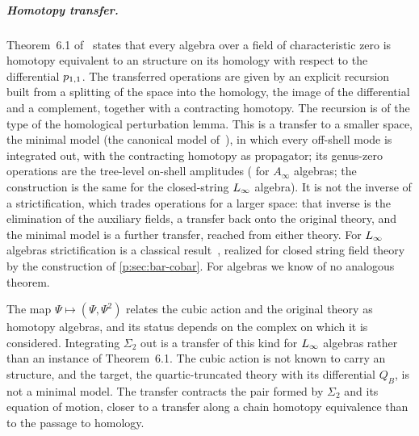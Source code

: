 \subparagraph{Homotopy transfer.}

Theorem~6.1 of~\cite{Cieliebak:2015:HomologicalAlgebraRelated} states that every \IBL{} algebra over a field of characteristic zero is homotopy equivalent to an \IBL{} structure on its homology with respect to the differential $p_{1,1}$.
The transferred operations are given by an explicit recursion built from a splitting of the space into the homology, the image of the differential and a complement, together with a contracting homotopy.
The recursion is of the type of the homological perturbation lemma.
This is a transfer to a smaller space, the minimal model (the canonical model of~\cite{Cieliebak:2015:HomologicalAlgebraRelated}), in which every off-shell mode is integrated out, with the contracting homotopy as propagator; its genus-zero operations are the tree-level on-shell amplitudes (\cite{Kajiura:2007:NoncommutativeHomotopyAlgebras} for $A_\infty$ algebras; the construction is the same for the closed-string $L_\infty$ algebra).
It is not the inverse of a strictification, which trades operations for a larger space: that inverse is the elimination of the auxiliary fields, a transfer back onto the original theory, and the minimal model is a further transfer, reached from either theory.
For $L_\infty$ algebras strictification is a classical result~\cite{Loday:2012:AlgebraicOperads}, realized for closed string field theory by the construction of \cref{p:sec:bar-cobar}.
For \IBL{} algebras we know of no analogous theorem.

The map $\Psi \mapsto (\Psi, \Psi^2)$ relates the cubic action and the original theory as homotopy algebras, and its status depends on the complex on which it is considered.
Integrating $\Sigma_2$ out is a transfer of this kind for $L_\infty$ algebras rather than an instance of Theorem~6.1.
The cubic action is not known to carry an \IBL{} structure, and the target, the quartic-truncated theory with its differential $Q_B$, is not a minimal model.
The transfer contracts the pair formed by $\Sigma_2$ and its equation of motion, closer to a transfer along a chain homotopy equivalence than to the passage to homology.

